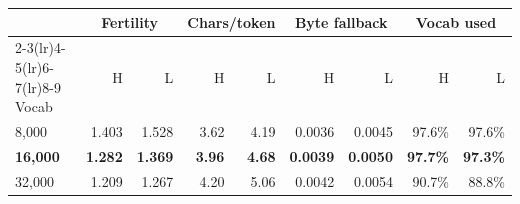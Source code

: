 \begin{tabular}{lrrrrrrrr}
\toprule
& \multicolumn{2}{c}{Fertility} & \multicolumn{2}{c}{Chars/token} & \multicolumn{2}{c}{Byte fallback} & \multicolumn{2}{c}{Vocab used} \\
\cmidrule(lr){2-3}\cmidrule(lr){4-5}\cmidrule(lr){6-7}\cmidrule(lr){8-9}
Vocab & H & L & H & L & H & L & H & L \\
\midrule
8,000 & 1.403 & 1.528 & 3.62 & 4.19 & 0.0036 & 0.0045 & 97.6\% & 97.6\% \\
\textbf{16,000} & \textbf{1.282} & \textbf{1.369} & \textbf{3.96} & \textbf{4.68} & \textbf{0.0039} & \textbf{0.0050} & \textbf{97.7\%} & \textbf{97.3\%} \\
32,000 & 1.209 & 1.267 & 4.20 & 5.06 & 0.0042 & 0.0054 & 90.7\% & 88.8\% \\
\bottomrule
\end{tabular}
